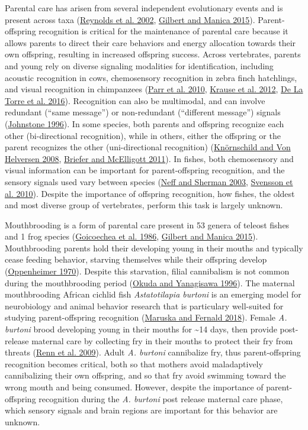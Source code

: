 \documentclass[
  12pt,
]{article}
\begin{document}
Parental care has arisen from several independent evolutionary events and is present across taxa (\protect\hyperlink{ref-RN2}{Reynolds et al. 2002}, \protect\hyperlink{ref-RN1}{Gilbert and Manica 2015}). Parent-offspring recognition is critical for the maintenance of parental care because it allows parents to direct their care behaviors and energy allocation towards their own offspring, resulting in increased offspring success. Across vertebrates, parents and young rely on diverse signaling modalities for identification, including acoustic recognition in cows, chemosensory recognition in zebra finch hatchlings, and visual recognition in chimpanzees (\protect\hyperlink{ref-RN5}{Parr et al. 2010}, \protect\hyperlink{ref-RN4}{Krause et al. 2012}, \protect\hyperlink{ref-RN3}{De La Torre et al. 2016}). Recognition can also be multimodal, and can involve redundant (``same message'') or non-redundant (``different message'') signals (\protect\hyperlink{ref-RN6}{Johnstone 1996}). In some species, both parents and offspring recognize each other (bi-directional recognition), while in others, either the offspring or the parent recognizes the other (uni-directional recognition) (\protect\hyperlink{ref-RN7}{Knörnschild and Von Helversen 2008}, \protect\hyperlink{ref-RN8}{Briefer and McElligott 2011}). In fishes, both chemosensory and visual information can be important for parent-offspring recognition, and the sensory signals used vary between species (\protect\hyperlink{ref-RN9}{Neff and Sherman 2003}, \protect\hyperlink{ref-RN10}{Svensson et al. 2010}). Despite the importance of offspring recognition, how fishes, the oldest and most diverse group of vertebrates, perform this task is largely unknown.

Mouthbrooding is a form of parental care present in 53 genera of teleost fishes and 1 frog species (\protect\hyperlink{ref-RN12}{Goicoechea et al. 1986}, \protect\hyperlink{ref-RN1}{Gilbert and Manica 2015}). Mouthbrooding parents hold their developing young in their mouths and typically cease feeding behavior, starving themselves while their offspring develop (\protect\hyperlink{ref-RN11}{Oppenheimer 1970}). Despite this starvation, filial cannibalism is not common during the mouthbrooding period (\protect\hyperlink{ref-RN13}{Okuda and Yanagisawa 1996}). The maternal mouthbrooding African cichlid fish \emph{Astatotilapia burtoni} is an emerging model for neurobiology and animal behavior research that is particulary well-suited for studying parent-offspring recognition (\protect\hyperlink{ref-RN14}{Maruska and Fernald 2018}). Female \emph{A. burtoni} brood developing young in their mouths for \textasciitilde14 days, then provide post-release maternal care by collecting fry in their mouths to protect their fry from threats (\protect\hyperlink{ref-RN15}{Renn et al. 2009}). Adult \emph{A. burtoni} cannibalize fry, thus parent-offspring recognition becomes critical, both so that mothers avoid maladaptively cannibalizing their own offspring, and so that fry avoid swimming toward the wrong mouth and being consumed. However, despite the importance of parent-offspring recognition during the \emph{A. burtoni} post release maternal care phase, which sensory signals and brain regions are important for this behavior are unknown.
\end{document}
